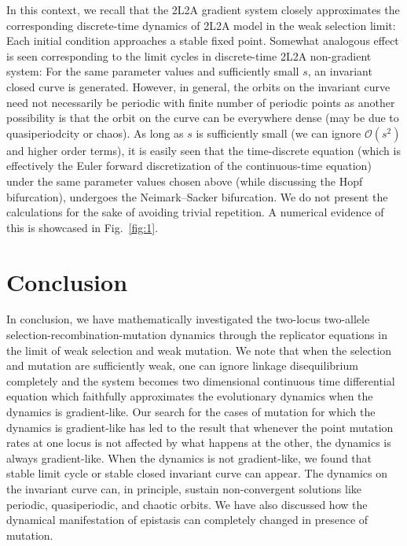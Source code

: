 \documentclass[
 pre,
 aps,
 a4paper,
 english,
 showkeys,
 reprint,
 twocolumn,
 superscriptaddress
]{revtex4}
\begin{document}
In this context, we recall that the  2L2A gradient system closely approximates the corresponding discrete-time dynamics of  2L2A model in the weak selection limit: Each initial condition approaches a stable fixed point. Somewhat analogous effect is seen corresponding to the limit cycles in discrete-time 2L2A non-gradient system: For the same parameter values and sufficiently small $s$, an invariant closed curve is generated. However, in general, the orbits on the invariant curve need not necessarily be periodic with finite number of periodic points as another possibility is that the orbit on the curve can be everywhere dense (may be due to quasiperiodcity or chaos). As long as $s$ is sufficiently small (we can ignore $\mathcal{O}(s^2)$ and higher order terms), it is easily seen that  the time-discrete equation (which is effectively the Euler forward discretization of the continuous-time equation) under the same parameter values chosen above (while discussing the Hopf bifurcation), undergoes the Neimark--Sacker bifurcation. We do not present the calculations for the sake of avoiding trivial repetition. A numerical evidence of this is showcased in Fig.~\ref{fig:1}.
%


\section{Conclusion}
In conclusion, we have mathematically investigated the two-locus two-allele selection-recombination-mutation dynamics through the replicator equations in the limit of weak selection and weak mutation. We note that when the selection and mutation are sufficiently weak, one can ignore linkage disequilibrium completely and the system becomes two dimensional continuous time differential equation which faithfully approximates the evolutionary dynamics when the dynamics is gradient-like. Our search for the cases of mutation for which the dynamics is gradient-like has led to the result that whenever the point mutation rates at one locus is not affected by what happens at the other, the dynamics is always gradient-like. When the dynamics is not gradient-like, we found that stable limit cycle or stable closed invariant curve can appear. The dynamics on the invariant curve can, in principle, sustain non-convergent solutions like periodic, quasiperiodic, and chaotic orbits. We have also discussed how the dynamical manifestation of epistasis can completely changed in presence of mutation. 
\end{document}

